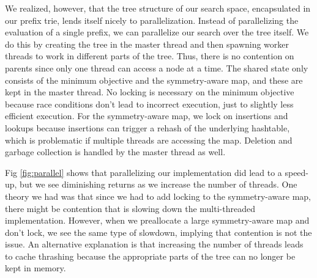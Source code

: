 We realized, however, that the tree structure of our search space, encapsulated in our prefix trie, lends itself nicely to parallelization.
Instead of parallelizing the evaluation of a single prefix, we can parallelize our search over the tree itself.
We do this by creating the tree in the master thread and then spawning worker threads to work in different parts of the tree.
Thus, there is no contention on parents since only one thread can access a node at a time.
The shared state only consists of the minimum objective and the symmetry-aware map, and these are kept in the master thread.
No locking is necessary on the minimum objective because race conditions don't lead to incorrect execution, just to slightly less efficient execution.
For the symmetry-aware map, we lock on insertions and lookups because insertions can trigger a rehash of the underlying hashtable, which is problematic if multiple threads are accessing the map. 
Deletion and garbage collection is handled by the master thread as well.

Fig \ref{fig:parallel} shows that parallelizing our implementation did lead to a speed-up, but we see diminishing returns as we increase the number of threads.
One theory we had was that since we had to add locking to the symmetry-aware map, there might be contention that is slowing down the multi-threaded implementation.
However, when we preallocate a large symmetry-aware map and don't lock, we see the same type of slowdown, implying that contention is not the issue.
An alternative explanation is that increasing the number of threads leads to cache thrashing because the appropriate parts of the tree can no longer be kept in memory.